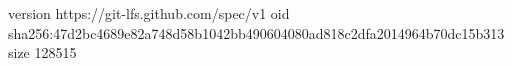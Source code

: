 version https://git-lfs.github.com/spec/v1
oid sha256:47d2bc4689e82a748d58b1042bb490604080ad818c2dfa2014964b70dc15b313
size 128515

